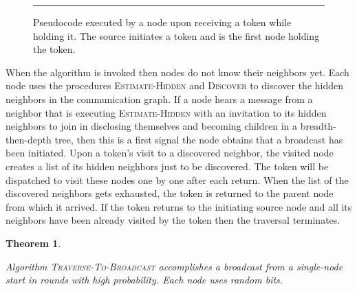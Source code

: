 \documentclass[11pt]{article}
\newcommand{\FF}{\vspace*{\medskipamount}}
\newtheorem{theorem}{Theorem}
\begin{document}
\begin{figure}[t]
\begin{enumerate}[nosep]
\begin{itemize}[nosep]
\end{itemize}
\end{enumerate}

\FF

\hrule

\caption{\label{alg:Traverse-To-Broadcast}
Pseudocode executed by a node  upon receiving a token while holding it.
The source initiates a token and is the first node holding the token.}
\end{figure}



When the algorithm  is invoked then nodes do not know their neighbors yet.
Each node uses the procedures \textsc{Estimate-Hidden} and \textsc{Discover} to discover the hidden neighbors in the communication graph.
If a node hears a message from a neighbor that is executing \textsc{Estimate-Hidden} with an invitation to its hidden neighbors to join in disclosing themselves and becoming children in a breadth-then-depth tree, then this is a first signal the node obtains that a broadcast has been initiated.
Upon a token's visit to a discovered neighbor, the visited node creates a list of its hidden neighbors  just to be discovered.
The token will be dispatched to visit these nodes one by one after each return.
When the list of the discovered neighbors gets exhausted, the token is returned to the parent node from which it arrived.
If the token returns to the initiating source node and all its neighbors have been already visited by the token  then the traversal terminates.



\begin{theorem}
\label{thm:traverse-to-broadcast}

Algorithm  \textsc{Traverse-To-Broadcast} accomplishes a broadcast from a single-node start in  rounds with high probability. 
Each node uses  random bits.
\end{theorem}
\end{document}
